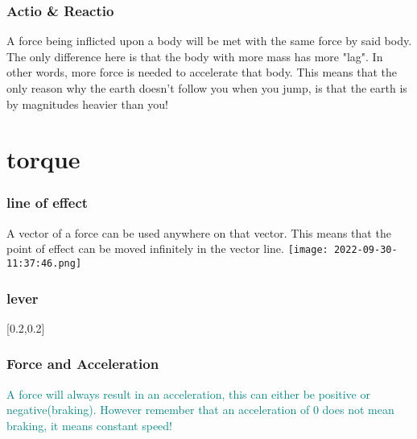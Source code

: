 \documentclass[main.tex,fontsize=8pt,paper=a4,paper=portrait,DIV=calc,]{scrartcl}
\begin{document}
\begin{multicols*}{2}
\subsubsection{Actio \& Reactio}
A force being inflicted upon a body will be met with the same force by said body.\newline
The only difference here is that the body with more mass has more "lag". \newline
In other words, more force is needed to accelerate that body.\newline
This means that the only reason why the earth doesn't follow you when you jump,\newline
is that the earth is by magnitudes heavier than you!\newline
{}

\section{torque}
\subsubsection{line of effect}
A vector of a force can be used anywhere on that vector.\newline
This means that the point of effect can be moved infinitely in the vector line.\newline
\texttt{[image: 2022-09-30-11:37:46.png]}

\subsubsection{lever} 
[0.2,0.2]

\subsubsection{Force and Acceleration} 
\textcolor{teal}{A force will always result in an acceleration, this can either be positive or negative(braking).\newline
However remember that an acceleration of 0 does not mean braking, it means constant speed!}


\end{multicols*}
\end{document}
